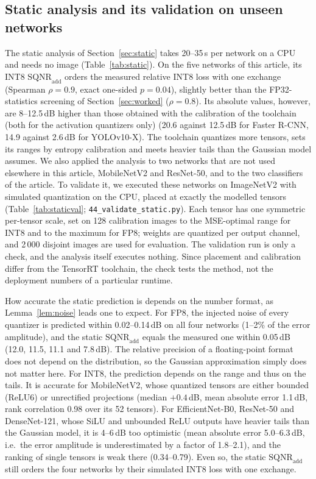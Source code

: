\documentclass[pdflatex,sn-mathphys-num]{sn-jnl}%
\theoremstyle{thmstyleone}%
\theoremstyle{thmstyletwo}%
\theoremstyle{thmstylethree}%
\begin{document}
\subsection{Static analysis and its validation on unseen networks}\label{sec:res-static}
The static analysis of Section~\ref{sec:static} takes 20--35\,s per network on a CPU and needs no image (Table~\ref{tab:static}). On the five networks of this article, its INT8 $\mathrm{SQNR}_\text{add}$ orders the measured relative INT8 loss with one exchange (Spearman $\rho=0.9$, exact one-sided $p=0.04$), slightly better than the FP32-statistics screening of Section~\ref{sec:worked} ($\rho=0.8$). Its absolute values, however, are 8--12.5\,dB higher than those obtained with the calibration of the toolchain (both for the activation quantizers only) (20.6 against 12.5\,dB for Faster R-CNN, 14.9 against 2.6\,dB for YOLOv10-X). The toolchain quantizes more tensors, sets its ranges by entropy calibration and meets heavier tails than the Gaussian model assumes. We also applied the analysis to two networks that are not used elsewhere in this article, MobileNetV2 and ResNet-50, and to the two classifiers of the article. To validate it, we executed these networks on ImageNetV2 with simulated quantization on the CPU, placed at exactly the modelled tensors (Table~\ref{tab:staticval}; \texttt{44\_validate\_static.py}). Each tensor has one symmetric per-tensor scale, set on 128 calibration images to the MSE-optimal range for INT8 and to the maximum for FP8; weights are quantized per output channel, and 2\,000 disjoint images are used for evaluation. The validation run is only a check, and the analysis itself executes nothing. Since placement and calibration differ from the TensorRT toolchain, the check tests the method, not the deployment numbers of a particular runtime.

How accurate the static prediction is depends on the number format, as Lemma~\ref{lem:noise} leads one to expect. For FP8, the injected noise of every quantizer is predicted within 0.02--0.14\,dB on all four networks (1--2\% of the error amplitude), and the static $\mathrm{SQNR}_\text{add}$ equals the measured one within 0.05\,dB (12.0, 11.5, 11.1 and 7.8\,dB). The relative precision of a floating-point format does not depend on the distribution, so the Gaussian approximation simply does not matter here. For INT8, the prediction depends on the range and thus on the tails. It is accurate for MobileNetV2, whose quantized tensors are either bounded (ReLU6) or unrectified projections (median $+0.4$\,dB, mean absolute error 1.1\,dB, rank correlation 0.98 over its 52 tensors). For EfficientNet-B0, ResNet-50 and DenseNet-121, whose SiLU and unbounded ReLU outputs have heavier tails than the Gaussian model, it is 4--6\,dB too optimistic (mean absolute error 5.0--6.3\,dB, i.e.\ the error amplitude is underestimated by a factor of 1.8--2.1), and the ranking of single tensors is weak there (0.34--0.79). Even so, the static $\mathrm{SQNR}_\text{add}$ still orders the four networks by their simulated INT8 loss with one exchange.
\end{document}
